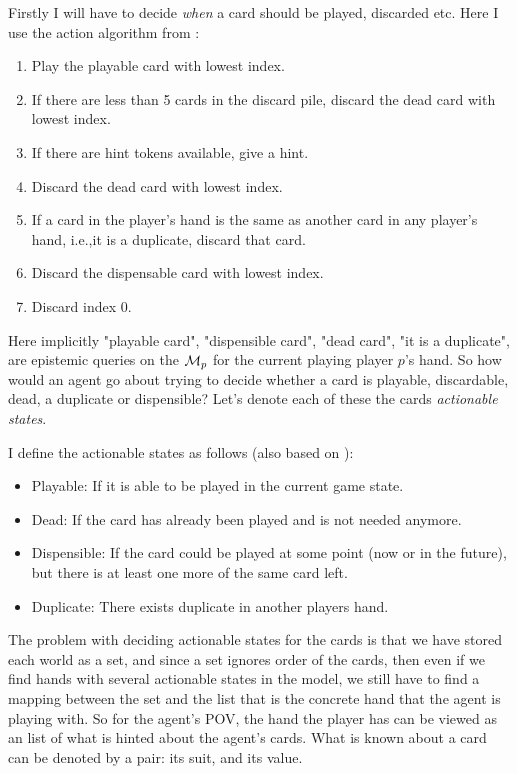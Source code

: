 
Firstly I will have to decide \emph{when} a card should be played, discarded etc. Here I use the action algorithm from \cite{CoxEtAl2015}:
\begin{enumerate}
	\item Play the playable card with lowest index.
	\item If there are less than 5 cards in the discard pile, discard the dead card with lowest index.
	\item If there are hint tokens available, give a hint.
	\item Discard the dead card with lowest index.
	\item If a card in the player’s hand is the same as another card in any player’s hand, i.e.,it is a duplicate, discard that card.
	\item Discard the dispensable card with lowest index.
	\item Discard index 0.
\end{enumerate}

Here implicitly "playable card", "dispensible card", "dead card", "it is a duplicate", are epistemic queries on the $\mathcal{M}_p$ for the current playing player $p$'s hand. So how would an agent go about trying to decide whether a card is playable, discardable, dead, a duplicate or dispensible? Let's denote each of these the cards \emph{actionable states}.

I define the actionable states as follows (also based on \cite{CoxEtAl2015}):
\begin{itemize}
	\item Playable: If it is able to be played in the current game state.
	\item Dead: If the card has already been played and is not needed anymore.
	\item Dispensible: If the card could be played at some point (now or in the future), but there is at least one more of the same card left.
	\item Duplicate: There exists duplicate in another players hand.
\end{itemize}

The problem with deciding actionable states for the cards is that we have stored each world as a set, and since a set ignores order of the cards, then even if we find hands with several actionable states in the model, we still have to find a mapping between the set and the list that is the concrete hand that the agent is playing with.
So for the agent's POV, the hand the player has can be viewed as an list of what is hinted about the agent's cards. What is known about a card can be denoted by a pair: its suit, and its value. 

